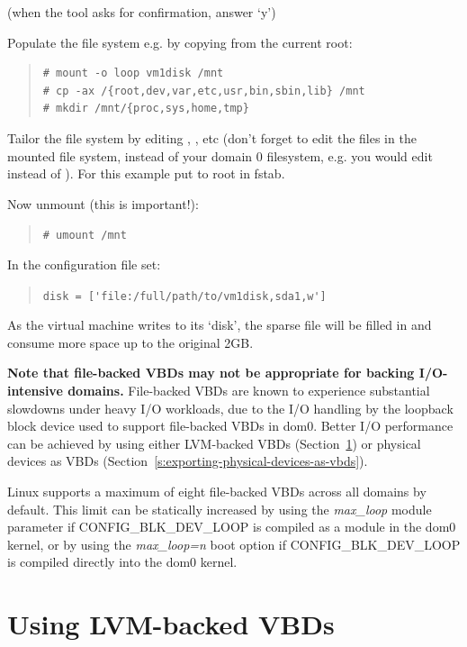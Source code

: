 \documentclass[11pt,twoside,final,openright]{report}
\begin{document}
(when the tool asks for confirmation, answer `y')

Populate the file system e.g. by copying from the current root:
\begin{quote}
\begin{verbatim}
# mount -o loop vm1disk /mnt
# cp -ax /{root,dev,var,etc,usr,bin,sbin,lib} /mnt
# mkdir /mnt/{proc,sys,home,tmp}
\end{verbatim}
\end{quote}

Tailor the file system by editing ,
, etc (don't forget to edit the files in the
mounted file system, instead of your domain 0 filesystem, e.g. you
would edit  instead of  ).  For
this example put  to root in fstab.

Now unmount (this is important!):
\begin{quote}
\verb_# umount /mnt_
\end{quote}

In the configuration file set:
\begin{quote}
\verb_disk = ['file:/full/path/to/vm1disk,sda1,w']_
\end{quote}

As the virtual machine writes to its `disk', the sparse file will be
filled in and consume more space up to the original 2GB.

{\bf Note that file-backed VBDs may not be appropriate for backing
I/O-intensive domains.}  File-backed VBDs are known to experience
substantial slowdowns under heavy I/O workloads, due to the I/O handling
by the loopback block device used to support file-backed VBDs in dom0.
Better I/O performance can be achieved by using either LVM-backed VBDs
(Section~\ref{s:using-lvm-backed-vbds}) or physical devices as VBDs
(Section~\ref{s:exporting-physical-devices-as-vbds}).

Linux supports a maximum of eight file-backed VBDs across all domains by
default.  This limit can be statically increased by using the {\em
max\_loop} module parameter if CONFIG\_BLK\_DEV\_LOOP is compiled as a
module in the dom0 kernel, or by using the {\em max\_loop=n} boot option
if CONFIG\_BLK\_DEV\_LOOP is compiled directly into the dom0 kernel.


\section{Using LVM-backed VBDs}
\label{s:using-lvm-backed-vbds}
\end{document}

